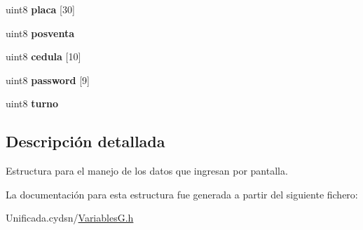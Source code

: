 \begin{DoxyCompactItemize}
uint8 {\bfseries placa} \mbox{[}30\mbox{]}
\item 
\mbox{\label{structbuffer_a2e612a905833196cd952ab78808787ba}} 
uint8 {\bfseries posventa}
\item 
\mbox{\label{structbuffer_aed8552db81c57154d7bfc96378baab38}} 
uint8 {\bfseries cedula} \mbox{[}10\mbox{]}
\item 
\mbox{\label{structbuffer_abeabd3e6083f7fd6f6b18b950ab9904b}} 
uint8 {\bfseries password} \mbox{[}9\mbox{]}
\item 
\mbox{\label{structbuffer_a5c53efd180268c0ad1aa3c7872f8abdd}} 
uint8 {\bfseries turno}
\end{DoxyCompactItemize}


\subsection{Descripción detallada}
Estructura para el manejo de los datos que ingresan por pantalla. 

La documentación para esta estructura fue generada a partir del siguiente fichero\+:\begin{DoxyCompactItemize}
\item 
Unificada.\+cydsn/\mbox{\hyperlink{_variables_g_8h}{Variables\+G.\+h}}\end{DoxyCompactItemize}
